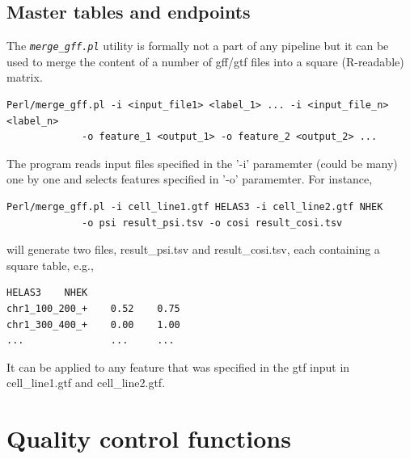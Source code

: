 \documentclass{article}
\newcommand{\prog}[1]{{\tt\em #1}}
\begin{document}
\subsection{Master tables and endpoints}
The \prog{merge\_gff.pl} utility is formally not a part of any pipeline but it can be used to merge the content of a number of gff/gtf 
files into a square (R-readable) matrix.
\begin{verbatim}
Perl/merge_gff.pl -i <input_file1> <label_1> ... -i <input_file_n> <label_n>
             -o feature_1 <output_1> -o feature_2 <output_2> ...
\end{verbatim}
The program reads input files specified in the '-i' paramemter (could be many) one by one and selects features specified in '-o' paramemter. For instance,
\begin{verbatim}
Perl/merge_gff.pl -i cell_line1.gtf HELAS3 -i cell_line2.gtf NHEK 
             -o psi result_psi.tsv -o cosi result_cosi.tsv
\end{verbatim}
will generate two files, result\_psi.tsv and result\_cosi.tsv, each containing a square table, e.g.,
\begin{verbatim}
HELAS3    NHEK
chr1_100_200_+    0.52    0.75
chr1_300_400_+    0.00    1.00
...               ...     ...
\end{verbatim}
It can be applied to any feature that was specified in the gtf input in cell\_line1.gtf and cell\_line2.gtf.

\section{Quality control functions}
\end{document}

